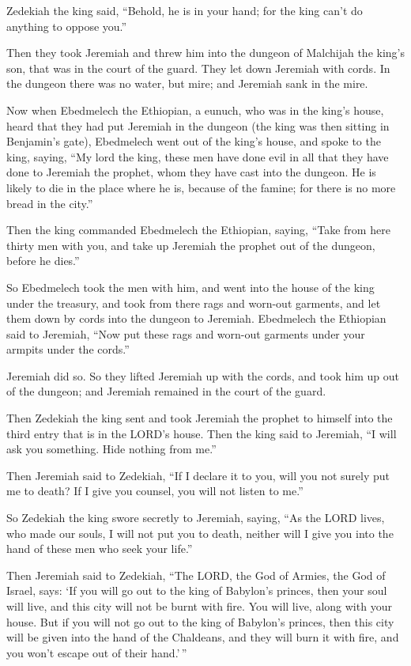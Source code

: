  Zedekiah the king said, ``Behold, he is in your hand; for
the king can't do anything to oppose you.''

 Then they took Jeremiah and threw him into the dungeon of
Malchijah the king's son, that was in the court of the guard. They let
down Jeremiah with cords. In the dungeon there was no water, but mire;
and Jeremiah sank in the mire.

 Now when Ebedmelech the Ethiopian, a eunuch, who was in the
king's house, heard that they had put Jeremiah in the dungeon (the king
was then sitting in Benjamin's gate),  Ebedmelech went out
of the king's house, and spoke to the king, saying,  ``My
lord the king, these men have done evil in all that they have done to
Jeremiah the prophet, whom they have cast into the dungeon. He is likely
to die in the place where he is, because of the famine; for there is no
more bread in the city.''

 Then the king commanded Ebedmelech the Ethiopian, saying,
``Take from here thirty men with you, and take up Jeremiah the prophet
out of the dungeon, before he dies.''

 So Ebedmelech took the men with him, and went into the
house of the king under the treasury, and took from there rags and
worn-out garments, and let them down by cords into the dungeon to
Jeremiah.  Ebedmelech the Ethiopian said to Jeremiah, ``Now
put these rags and worn-out garments under your armpits under the
cords.''

Jeremiah did so.  So they lifted Jeremiah up with the
cords, and took him up out of the dungeon; and Jeremiah remained in the
court of the guard.

 Then Zedekiah the king sent and took Jeremiah the prophet
to himself into the third entry that is in the LORD's house. Then the
king said to Jeremiah, ``I will ask you something. Hide nothing from
me.''

 Then Jeremiah said to Zedekiah, ``If I declare it to you,
will you not surely put me to death? If I give you counsel, you will not
listen to me.''

 So Zedekiah the king swore secretly to Jeremiah, saying,
``As the LORD lives, who made our souls, I will not put you to death,
neither will I give you into the hand of these men who seek your life.''

 Then Jeremiah said to Zedekiah, ``The LORD, the God of
Armies, the God of Israel, says: `If you will go out to the king of
Babylon's princes, then your soul will live, and this city will not be
burnt with fire. You will live, along with your house.  But
if you will not go out to the king of Babylon's princes, then this city
will be given into the hand of the Chaldeans, and they will burn it with
fire, and you won't escape out of their hand.'\,''

